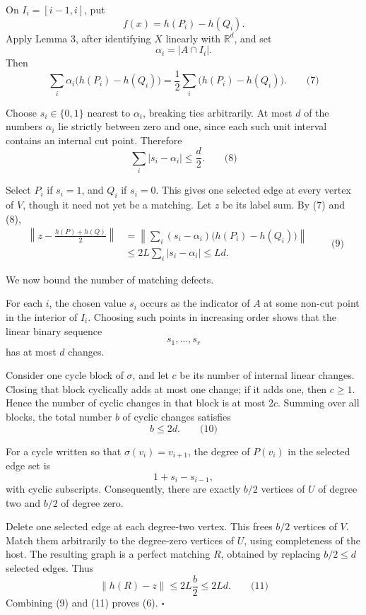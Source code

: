 \documentclass[
  11pt,
  a4paper,
]{article}
\begin{document}
On \(I_i=[i-1,i]\), put \[
f(x)=h(P_i)-h(Q_i).
\] Apply Lemma 3, after identifying \(X\) linearly with \(\mathbb R^d\),
and set \[
\alpha_i=|A\cap I_i|.
\] Then \[
\sum_i\alpha_i\bigl(h(P_i)-h(Q_i)\bigr)
=\frac12\sum_i\bigl(h(P_i)-h(Q_i)\bigr).
\qquad\text{(7)}
\]

Choose \(s_i\in\{0,1\}\) nearest to \(\alpha_i\), breaking ties
arbitrarily. At most \(d\) of the numbers \(\alpha_i\) lie strictly
between zero and one, since each such unit interval contains an internal
cut point. Therefore \[
\sum_i|s_i-\alpha_i|\le \frac d2.
\qquad\text{(8)}
\]

Select \(P_i\) if \(s_i=1\), and \(Q_i\) if \(s_i=0\). This gives one
selected edge at every vertex of \(V\), though it need not yet be a
matching. Let \(z\) be its label sum. By (7) and (8), \begin{equation*}
\begin{aligned}
\left\|z-\frac{h(P)+h(Q)}2\right\|
&=
\left\|
\sum_i(s_i-\alpha_i)\bigl(h(P_i)-h(Q_i)\bigr)
\right\|\\
&\le 2L\sum_i|s_i-\alpha_i|
\le Ld.
\end{aligned}
\qquad\text{(9)}
\end{equation*}

We now bound the number of matching defects.

For each \(i\), the chosen value \(s_i\) occurs as the indicator of
\(A\) at some non-cut point in the interior of \(I_i\). Choosing such
points in increasing order shows that the linear binary sequence \[
s_1,\ldots,s_r
\] has at most \(d\) changes.

Consider one cycle block of \(\sigma\), and let \(c\) be its number of
internal linear changes. Closing that block cyclically adds at most one
change; if it adds one, then \(c\ge1\). Hence the number of cyclic
changes in that block is at most \(2c\). Summing over all blocks, the
total number \(b\) of cyclic changes satisfies \[
b\le 2d.
\qquad\text{(10)}
\]

For a cycle written so that \(\sigma(v_i)=v_{i+1}\), the degree of
\(P(v_i)\) in the selected edge set is \[
1+s_i-s_{i-1},
\] with cyclic subscripts. Consequently, there are exactly \(b/2\)
vertices of \(U\) of degree two and \(b/2\) of degree zero.

Delete one selected edge at each degree-two vertex. This frees \(b/2\)
vertices of \(V\). Match them arbitrarily to the degree-zero vertices of
\(U\), using completeness of the host. The resulting graph is a perfect
matching \(R\), obtained by replacing \(b/2\le d\) selected edges. Thus
\[
\|h(R)-z\|\le 2L\frac b2\le 2Ld.
\qquad\text{(11)}
\] Combining (9) and (11) proves (6). \(\square\)
\end{document}
